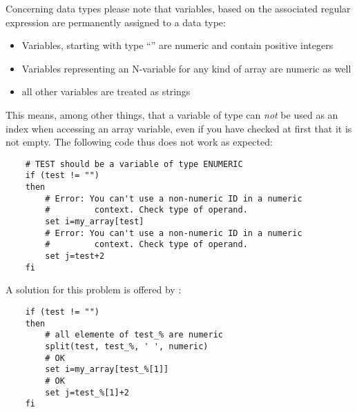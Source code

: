 
    Concerning data types please note that variables, based on the associated
    regular expression are permanently assigned to a data type:

\begin{itemize}
\item Variables, starting with type ``'' are numeric and
      contain positive integers
\item Variables representing an N-variable for any kind of array are numeric as well
\item all other variables are treated as strings
\end{itemize}

    This means, among other things, that a variable of type 
    can \emph{not} be used as an index when accessing an array variable, even if
    you have checked at first that it is not empty.
    The following code thus does not work as expected:
\begin{example}
\begin{verbatim}
    # TEST should be a variable of type ENUMERIC
    if (test != "")
    then
        # Error: You can't use a non-numeric ID in a numeric
        #         context. Check type of operand.
        set i=my_array[test]
        # Error: You can't use a non-numeric ID in a numeric
        #         context. Check type of operand.
        set j=test+2
    fi
\end{verbatim}
\end{example}

    A solution for this problem is offered by :
\begin{example}
\begin{verbatim}
    if (test != "")
    then
        # all elemente of test_% are numeric
        split(test, test_%, ' ', numeric)
        # OK
        set i=my_array[test_%[1]]
        # OK
        set j=test_%[1]+2
    fi
\end{verbatim}
\end{example}


